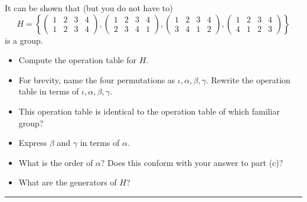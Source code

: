 \documentclass[titlepage]{article}
\newenvironment{problem}[2][Problem]{\begin{trivlist}
\item[\hskip \labelsep {\bfseries #1}\hskip \labelsep {\bfseries #2.}]}{\end{trivlist}}
\begin{document}
\begin{problem}{9}
It can be shown that (but you do not have to)
$$H = \left\{\left(\begin{array}{cccc} 1 & 2 & 3 & 4 \\ 1 & 2 & 3 & 4\end{array} \right), \left(\begin{array}{cccc} 1 & 2 & 3 & 4 \\ 2 & 3 & 4 & 1\end{array}  \right), \left(\begin{array}{cccc} 1 & 2 & 3 & 4 \\ 3 & 4 & 1 & 2\end{array} \right), \left(\begin{array}{cccc} 1 & 2 & 3 & 4 \\ 4 & 1 & 2 & 3 \end{array} \right)\right\} $$
is a group.
\begin{itemize}
\item[(a)] Compute the operation table for $H$.
\item[(b)] For brevity, name the four permutations as $\iota,\alpha,\beta,\gamma.$ Rewrite the operation table in terms of $\iota,\alpha,\beta,\gamma.$
\item[(c)] This operation table is identical to the operation table of which familiar group?
\item[(d)] Express $\beta$ and $\gamma$ in terms of $\alpha$.
\item[(e)] What is the order of $\alpha$? Does this conform with your answer to part (c)?
\item[(f)] What are the generators of $H$?
\end{itemize}
\hrule


\end{problem}
\end{document}
